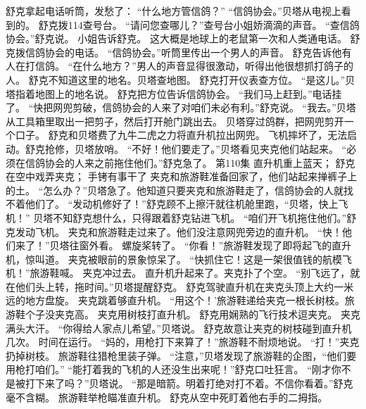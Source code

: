 \documentclass[a4paper,12pt,UTF8,twoside]{ctexbook}
\begin{document}
        舒克拿起电话听筒，发愁了：  “什么地方管信鸽？” 
        “信鸽协会。”贝塔从电视上看到的。 
        舒克拨114查号台。 
        “请问您查哪儿？”查号台小姐娇滴滴的声音。 
        “查信鸽协会。”舒克说。 
        小姐告诉舒克。 
        这大概是地球上的老鼠第一次和人类通电话。 
        舒克拨信鸽协会的电话。 
        “信鸽协会。”听筒里传出一个男人的声音。 
        舒克告诉他有人在打信鸽。 
        “在什么地方？”男人的声音显得很激动，听得出他很想抓打鸽子的人。 
        舒克不知道这里的地名。贝塔查地图。 
        舒克打开仪表查方位。 
        “是这儿。”贝塔指着地图上的地名说。 
        舒克把方位告诉信鸽协会。 
        “我们马上赶到。”电话挂了。 
        “快把网兜剪破，信鸽协会的人来了对咱们未必有利。”舒克说。 
        “我去。”贝塔从工具箱里取出一把剪子，然后打开舱门跳出去。 
        贝塔穿过鸽群，把网兜剪开一个口子。 
        舒克和贝塔费了九牛二虎之力将直升机拉出网兜。 
        飞机摔坏了，无法启动。舒克抢修，贝塔放哨。 
        “不好！他们要走了。”贝塔看见夹克他们站起来。 
        “必须在信鸽协会的人来之前拖住他们。”舒克急了。   第110集 
        直升机重上蓝天； 
        舒克在空中戏弄夹克； 
        手铐有事干了   
        夹克和旅游鞋准备回家了，他们站起来掸裤子上的土。 
        “怎么办？”贝塔急了。他知道只要夹克和旅游鞋走了，信鸽协会的人就找不着他们了。 
        “发动机修好了！”舒克顾不上擦汗就往机舱里跑，“贝塔，快上飞机！” 
        贝塔不知舒克想什么，只得跟着舒克钻进飞机。 
        “咱们开飞机拖住他们。”舒克发动飞机。 
        夹克和旅游鞋走过来了。他们没注意网兜旁边的直升机。 
        “快！他们来了！”贝塔往窗外看。 
        螺旋桨转了。 
        “你看！”旅游鞋发现了即将起飞的直升机，惊叫道。 
        夹克被眼前的景象惊呆了。 
        “快抓住它！这是一架很值钱的航模飞机！”旅游鞋喊。 
        夹克冲过去。 
        直升机升起来了。夹克扑了个空。 
        “别飞远了，就在他们头上转，拖时间。”贝塔提醒舒克。 
        舒克驾驶直升机在夹克头顶上大约一米远的地方盘旋。 
        夹克跳着够直升机。 
        “用这个！’旅游鞋递给夹克一根长树枝。旅游鞋个子没夹克高。 
        夹克用树枝打直升机。 
        舒克用娴熟的飞行技术逗夹克。 
        夹克满头大汗。 
        “你得给人家点儿希望。”贝塔说。 
        舒克故意让夹克的树枝碰到直升机几次。 
        时间在运行。 
        “妈的，用枪打下来算了！”旅游鞋不耐烦地说。 
        “打！”夹克扔掉树枝。 
        旅游鞋往猎枪里装子弹。 
        “注意，”贝塔发现了旅游鞋的企图，“他们要用枪打咱们。” 
        “能打着我的飞机的人还没生出来呢！”舒克口吐狂言。 
        “刚才你不是被打下来了吗？”贝塔说。 
        “那是暗箭。明着打绝对打不着。不信你看着。”舒克毫不含糊。 
        旅游鞋举枪瞄准直升机。 
        舒克从空中死盯着他右手的二拇指。 
\end{document}
